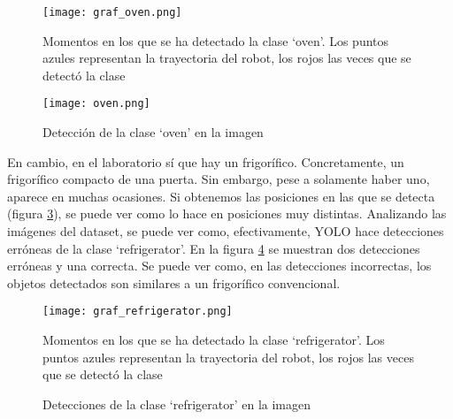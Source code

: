 \begin{figure}[h]
	\begin{center} 
		\texttt{[image: graf\_oven.png]}
	\end{center}
	\caption{Momentos en los que se ha detectado la clase `oven'. Los puntos azules representan la trayectoria del robot, los rojos las veces que se detectó la clase}
	\label{fig:graf_oven}
\end{figure}

\begin{figure}[h]
	\begin{center} 
		\texttt{[image: oven.png]}
	\end{center}
	\caption{Detección de la clase `oven' en la imagen}
	\label{fig:det_oven}
\end{figure}

En cambio, en el laboratorio sí que hay un frigorífico. Concretamente, un frigorífico compacto de una puerta. Sin embargo, pese a solamente haber uno, aparece en muchas ocasiones. Si obtenemos las posiciones en las que se detecta (figura \ref{fig:graf_refrigerator}), se puede ver como lo hace en posiciones muy distintas. Analizando las imágenes del dataset, se puede ver como, efectivamente, YOLO hace detecciones erróneas de la clase `refrigerator'. En la figura \ref{fig:det_refrigerator} se muestran dos detecciones erróneas y una correcta. Se puede ver como, en las detecciones incorrectas, los objetos detectados son similares a un frigorífico convencional.\\

\begin{figure}[h]
	\begin{center} 
		\texttt{[image: graf\_refrigerator.png]}
	\end{center}
	\caption{Momentos en los que se ha detectado la clase `refrigerator'. Los puntos azules representan la trayectoria del robot, los rojos las veces que se detectó la clase}
	\label{fig:graf_refrigerator}
\end{figure}

\begin{figure}[H]
 \centering
  \hspace{0.5cm}
 \caption{Detecciones de la clase `refrigerator' en la imagen}
 \label{fig:det_refrigerator}
\end{figure}

